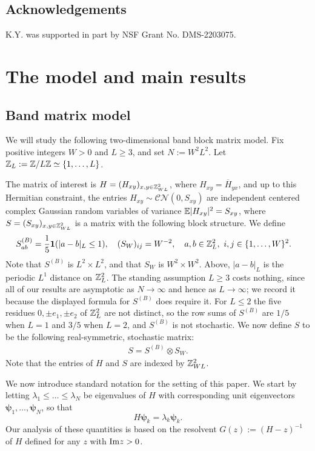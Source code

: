 \subsection*{Acknowledgements}
K.Y. was supported in part by NSF Grant No. DMS-2203075.




\section{The model and main results}\label{sec_model-results}
 \subsection{Band matrix model}\label{subsec_setting}

We will study the following two-dimensional band block matrix model. Fix positive integers $W>0$ and $L\geq3$, and set $N:=W^{2}L^{2}$. Let $\mathbb{Z}_{L}:=\mathbb{Z}/L\mathbb{Z}\simeq\{1,\ldots,L\}$.

The matrix of interest is $H=(H_{xy})_{x,y\in \mathbb{Z}_{WL}^{2}}$, where $H_{xy}=\overline{H}_{yx}$, and up to this Hermitian constraint, the entries $H_{xy}\sim\mathcal{CN}(0,S_{xy})$ are independent centered complex Gaussian random variables of variance $\mathbb{E}|H_{xy}|^{2}=S_{xy}$, where $S=(S_{xy})_{x,y\in \mathbb{Z}_{WL}^{2}}$ is a matrix with the following block structure. We define
%
\begin{align*}
S^{(B)}_{ab}&=\frac{1}{5}\mathbf{1}(|a-b|_{L}\leq1),\quad(S_{W})_{ij}=W^{-2},\quad a,b\in\mathbb{Z}_{L}^{2}, \ i,j\in\{1,\ldots,W\}^{2}.
\end{align*}
%
Note that $S^{(B)}$ is $L^{2}\times L^{2}$, and that $S_{W}$ is $W^{2}\times W^{2}$. Above, $|a-b|_{L}$ is the periodic $L^{1}$ distance on $\mathbb{Z}_{L}^{2}$. The standing assumption $L\geq3$ costs nothing, since all of our results are asymptotic as $N\to\infty$ and hence as $L\to\infty$; we record it because the displayed formula for $S^{(B)}$ does require it. For $L\leq2$ the five residues $0,\pm e_{1},\pm e_{2}$ of $\mathbb{Z}_{L}^{2}$ are not distinct, so the row sums of $S^{(B)}$ are $1/5$ when $L=1$ and $3/5$ when $L=2$, and $S^{(B)}$ is not stochastic. We now define $S$ to be the following real-symmetric, stochastic matrix:
%
\begin{align*}
S=S^{(B)}\otimes S_{W}.
\end{align*}
%
Note that the entries of $H$ and $S$ are indexed by $\mathbb{Z}_{WL}^{2}$. 

We now introduce standard notation for the setting of this paper. We start by letting $\lambda_{1}\leq\ldots\leq\lambda_{N}$ be eigenvalues of $H$ with corresponding unit eigenvectors $\boldsymbol{\psi}_{1},\ldots,\boldsymbol{\psi}_{N}$, so that
$$H\boldsymbol{\psi}_{k}=\lambda_{k}\boldsymbol{\psi}_{k}.$$ Our analysis of these quantities is based on the resolvent $G(z):=(H-z)^{-1}$ of $H$ defined for any $z$ with $\mathrm{Im} z>0$. 

